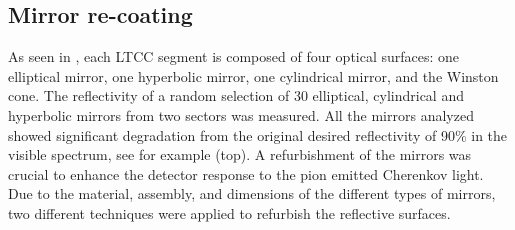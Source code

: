 \subsection{Mirror re-coating}

As seen in , each LTCC segment is composed of four optical surfaces: one elliptical mirror,
one hyperbolic mirror, one cylindrical mirror, and the Winston cone.
The reflectivity of a random selection of 30 elliptical, cylindrical and hyperbolic mirrors from two sectors was measured.
All the mirrors analyzed showed significant degradation from the original desired reflectivity of 90$\%$ in the visible spectrum,
see for example  (top).
A refurbishment of the mirrors was crucial to enhance the detector response to the pion emitted Cherenkov light.
Due to the material, assembly, and dimensions of the different types of mirrors, two different techniques were applied to refurbish the
reflective surfaces.

